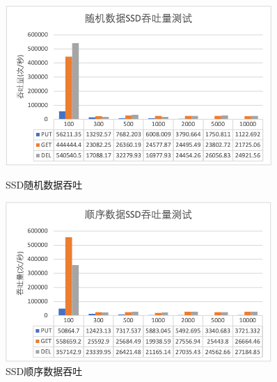\documentclass[fontset=windows]{article}
\begin{document}
\begin{figure}[H]
   \begin{minipage}[t]{0.5\linewidth} %
     \centering
     \includegraphics[width=0.9\textwidth]{img/random_SSD_throughput.png}
     \caption{SSD随机数据吞吐}
     \label{fig:r_S_t}
    \end{minipage}
    \begin{minipage}[t]{0.5\linewidth}   
     \centering   
     \includegraphics[width=0.9\textwidth]{img/sequential_SSD_throughput.png}   
     \caption{SSD顺序数据吞吐}   
     \label{fig:s_S_t}
   \end{minipage}
\end{figure}
\end{document}
